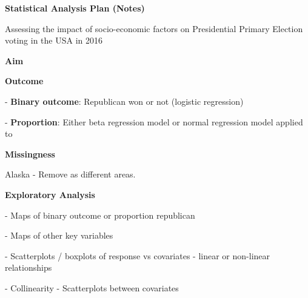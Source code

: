 \documentclass[
12pt, 
english, 
oneside,
doublespacing, %
nolistspacing, %
headsepline, %
]{../Thesis} %
\begin{document}
\frontmatter

\pagestyle{plain}


\mainmatter

{\bfseries\noindent\huge{Statistical Analysis Plan (Notes)}}

{\noindent\Large{Assessing the impact of socio-economic factors on Presidential Primary Election voting in the USA in 2016}} %

\newcommand{\myheading}[1]{\vspace{3ex}
{\bfseries\noindent\large{#1}}\par}


\myheading{Aim}



\myheading{Outcome}
- \textbf{Binary outcome}: Republican won or not (logistic regression)\par
- \textbf{Proportion}: Either beta regression model or normal regression model applied to 


\myheading{Missingness}
Alaska - Remove as different areas.


\myheading{Exploratory Analysis}
- Maps of binary outcome or proportion republican\par
- Maps of other key variables\par
- Scatterplots / boxplots of response vs covariates - linear or non-linear relationships\par
- Collinearity - Scatterplots between covariates

\end{document}
